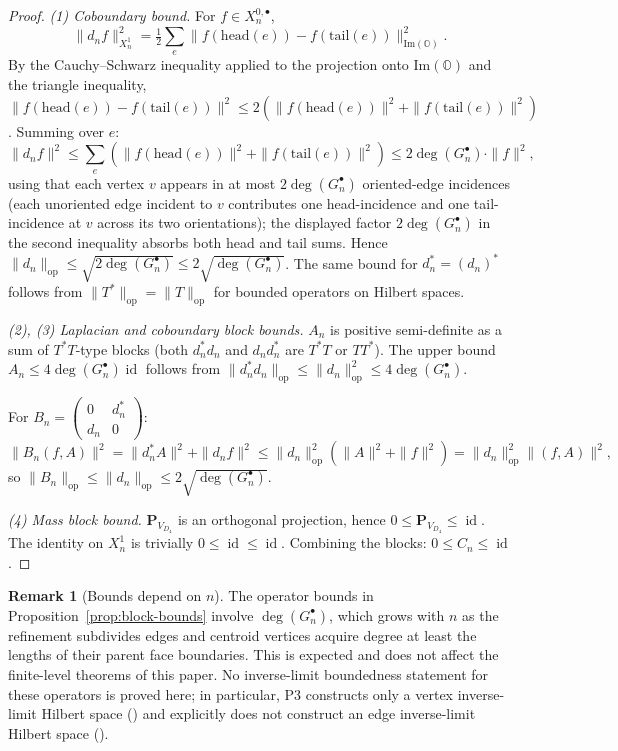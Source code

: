 \documentclass[11pt, a4paper]{amsart}
\theoremstyle{definition}
\newtheorem{remark}[theorem]{Remark}
\newcommand{\OO}{\mathbb{O}}
\newcommand{\id}{\operatorname{id}}
\newcommand{\op}{\operatorname{op}}
\renewcommand{\Im}{\mathrm{Im}}
\begin{document}
\begin{proof}
\emph{(1) Coboundary bound.} For $f \in X_n^{0, \bullet}$,
\[
  \|d_n f\|^2_{X_n^1} = \tfrac{1}{2} \sum_e \|f(\text{head}(e)) -
    f(\text{tail}(e))\|^2_{\Im(\OO)}.
\]
By the Cauchy--Schwarz inequality applied to the projection onto
$\Im(\OO)$ and the triangle inequality,
$\|f(\text{head}(e)) - f(\text{tail}(e))\|^2 \leq 2(\|f(\text{head}(e))
\|^2 + \|f(\text{tail}(e))\|^2)$. Summing over $e$:
\[
  \|d_n f\|^2 \leq \sum_e (\|f(\text{head}(e))\|^2 +
    \|f(\text{tail}(e))\|^2) \leq 2 \deg(G_n^\bullet) \cdot
    \|f\|^2,
\]
using that each vertex $v$ appears in at most
$2\deg(G_n^\bullet)$ oriented-edge incidences (each unoriented
edge incident to $v$ contributes one head-incidence and one
tail-incidence at $v$ across its two orientations); the
displayed factor $2\deg(G_n^\bullet)$ in the second inequality
absorbs both head and tail sums. Hence $\|d_n\|_{\op} \leq \sqrt{2
\deg(G_n^\bullet)} \leq 2\sqrt{\deg(G_n^\bullet)}$. The same
bound for $d_n^* = (d_n)^*$ follows from $\|T^*\|_{\op} = \|T\|_{\op}$
for bounded operators on Hilbert spaces.

\emph{(2), (3) Laplacian and coboundary block bounds.} $A_n$ is
positive semi-definite as a sum of $T^*T$-type blocks (both
$d_n^* d_n$ and $d_n d_n^*$ are $T^*T$ or $T T^*$). The upper
bound $A_n \leq 4 \deg(G_n^\bullet) \id$ follows from $\|d_n^* d_n
\|_{\op} \leq \|d_n\|_{\op}^2 \leq 4 \deg(G_n^\bullet)$.

For $B_n = \begin{pmatrix} 0 & d_n^* \\ d_n & 0 \end{pmatrix}$:
\[
  \|B_n(f, A)\|^2 = \|d_n^* A\|^2 + \|d_n f\|^2 \leq
    \|d_n\|_{\op}^2 (\|A\|^2 + \|f\|^2) = \|d_n\|_{\op}^2 \|(f, A)\|^2,
\]
so $\|B_n\|_{\op} \leq \|d_n\|_{\op} \leq 2\sqrt{\deg(G_n^\bullet)}$.

\emph{(4) Mass block bound.} $\mathbf{P}_{V_{D_4}}$ is an
orthogonal projection, hence $0 \leq \mathbf{P}_{V_{D_4}} \leq
\id$. The identity on $X_n^1$ is trivially $0 \leq \id \leq \id$.
Combining the blocks: $0 \leq C_n \leq \id$.
\end{proof}

\begin{remark}[Bounds depend on $n$]
\label{rmk:bounds-depend}
The operator bounds in Proposition~\ref{prop:block-bounds} involve
$\deg(G_n^\bullet)$, which grows with $n$ as the refinement
subdivides edges and centroid vertices acquire degree at least
the lengths of their parent face boundaries. This is expected
and does not affect the finite-level theorems of this paper. No
inverse-limit boundedness statement for these operators is
proved here; in particular, P3 constructs only a vertex
inverse-limit Hilbert space
(\cite[Theorem~\texttt{thm:Xinv-Hilbert}]{RefinementSpaces}) and
explicitly does not construct an edge inverse-limit Hilbert
space (\cite[Remark~\texttt{rmk:edge-inv}]{RefinementSpaces}).
\end{remark}
\end{document}
